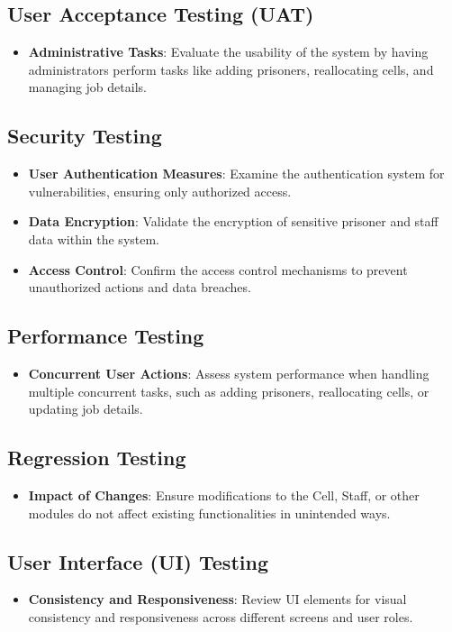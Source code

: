 \subsection{User Acceptance Testing (UAT)}
\begin{itemize}
    \item \textbf{Administrative Tasks}: Evaluate the usability of the system by having administrators perform tasks like adding prisoners, reallocating cells, and managing job details.
\end{itemize}

\subsection{Security Testing}
\begin{itemize}
    \item \textbf{User Authentication Measures}: Examine the authentication system for vulnerabilities, ensuring only authorized access.
    \item \textbf{Data Encryption}: Validate the encryption of sensitive prisoner and staff data within the system.
    \item \textbf{Access Control}: Confirm the access control mechanisms to prevent unauthorized actions and data breaches.
\end{itemize}

\subsection{Performance Testing}
\begin{itemize}
    \item \textbf{Concurrent User Actions}: Assess system performance when handling multiple concurrent tasks, such as adding prisoners, reallocating cells, or updating job details.
\end{itemize}

\subsection{Regression Testing}
\begin{itemize}
    \item \textbf{Impact of Changes}: Ensure modifications to the Cell, Staff, or other modules do not affect existing functionalities in unintended ways.
\end{itemize}

\subsection{User Interface (UI) Testing}
\begin{itemize}
    \item \textbf{Consistency and Responsiveness}: Review UI elements for visual consistency and responsiveness across different screens and user roles.
\end{itemize}

